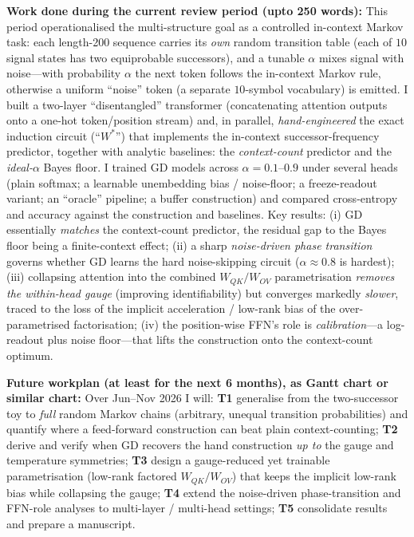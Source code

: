 \documentclass[12pt]{article}
\begin{document}
\medskip
\noindent\textbf{Work done during the current review period (upto 250 words):}
This period operationalised the multi-structure goal as a controlled in-context Markov task: each
length-200 sequence carries its \emph{own} random transition table (each of $10$ signal states has
two equiprobable successors), and a tunable $\alpha$ mixes signal with noise---with probability
$\alpha$ the next token follows the in-context Markov rule, otherwise a uniform ``noise'' token
(a separate $10$-symbol vocabulary) is emitted. I built a two-layer ``disentangled'' transformer
(concatenating attention outputs onto a one-hot token/position stream) and, in parallel,
\emph{hand-engineered} the exact induction circuit (``$W^{*}$'') that implements the in-context
successor-frequency predictor, together with analytic baselines: the \emph{context-count}
predictor and the \emph{ideal-$\alpha$} Bayes floor. I trained GD models across
$\alpha=0.1\text{--}0.9$ under several heads (plain softmax; a learnable unembedding bias /
noise-floor; a freeze-readout variant; an ``oracle'' pipeline; a buffer construction) and compared
cross-entropy and accuracy against the construction and baselines. Key results: (i) GD essentially
\emph{matches} the context-count predictor, the residual gap to the Bayes floor being a
finite-context effect; (ii) a sharp \emph{noise-driven phase transition} governs whether GD learns
the hard noise-skipping circuit ($\alpha\!\approx\!0.8$ is hardest); (iii) collapsing attention
into the combined $W_{QK}/W_{OV}$ parametrisation \emph{removes the within-head gauge} (improving
identifiability) but converges markedly \emph{slower}, traced to the loss of the implicit
acceleration / low-rank bias of the over-parametrised factorisation; (iv) the position-wise FFN's
role is \emph{calibration}---a log-readout plus noise floor---that lifts the construction onto the
context-count optimum.

\medskip
\noindent\textbf{Future workplan (at least for the next 6 months), as Gantt chart or similar
chart:}
Over Jun--Nov 2026 I will: \textbf{T1} generalise from the two-successor toy to \emph{full} random
Markov chains (arbitrary, unequal transition probabilities) and quantify where a feed-forward
construction can beat plain context-counting; \textbf{T2} derive and verify when GD recovers the
hand construction \emph{up to} the gauge and temperature symmetries; \textbf{T3} design a
gauge-reduced yet trainable parametrisation (low-rank factored $W_{QK}/W_{OV}$) that keeps the
implicit low-rank bias while collapsing the gauge; \textbf{T4} extend the noise-driven
phase-transition and FFN-role analyses to multi-layer / multi-head settings; \textbf{T5}
consolidate results and prepare a manuscript.
\end{document}
